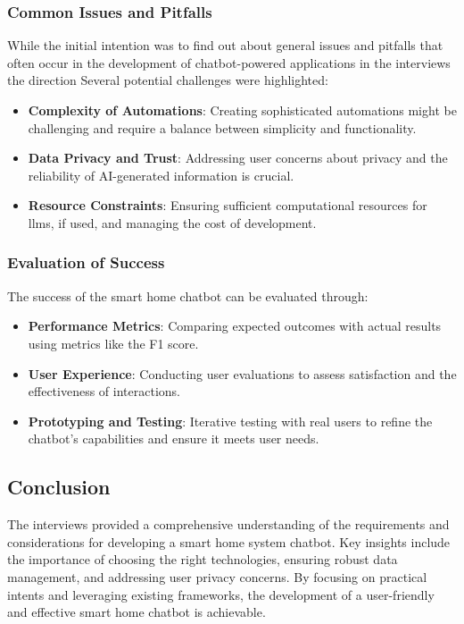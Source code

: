 \subsubsection{Common Issues and Pitfalls}

While the initial intention was to find out about general issues and pitfalls that often occur in the development of chatbot-powered applications in the interviews the direction 
Several potential challenges were highlighted:

\begin{itemize}
    \item \textbf{Complexity of Automations}: Creating sophisticated automations might be challenging and require a balance between simplicity and functionality.
    \item \textbf{Data Privacy and Trust}: Addressing user concerns about privacy and the reliability of AI-generated information is crucial.
    \item \textbf{Resource Constraints}: Ensuring sufficient computational resources for \glspl{llm}, if used, and managing the cost of development.
\end{itemize}

\subsubsection{Evaluation of Success}

The success of the smart home chatbot can be evaluated through:

\begin{itemize}
    \item \textbf{Performance Metrics}: Comparing expected outcomes with actual results using metrics like the F1 score.
    \item \textbf{User Experience}: Conducting user evaluations to assess satisfaction and the effectiveness of interactions.
    \item \textbf{Prototyping and Testing}: Iterative testing with real users to refine the chatbot's capabilities and ensure it meets user needs.
\end{itemize}

\subsection{Conclusion}

The interviews provided a comprehensive understanding of the requirements and considerations for developing a smart home system chatbot. Key insights include the importance of choosing the right technologies, ensuring robust data management, and addressing user privacy concerns. By focusing on practical intents and leveraging existing frameworks, the development of a user-friendly and effective smart home chatbot is achievable.


